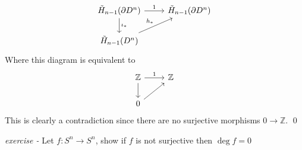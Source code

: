 \documentclass[11pt]{article}
\theoremstyle{definition}
\begin{document}
    \begin{equation*}
        \begin{tikzcd}
            \tilde{H}_{n-1}(\partial D^n) \arrow[r,"{1}"] \arrow[d,"{\iota_*}"] &\tilde{H}_{n-1}(\partial D^n) \\
            \tilde{H}_{n-1}(D^n) \arrow[ur,"{h_*}"]
        \end{tikzcd}
    \end{equation*}
    Where this diagram is equivalent to
    \begin{equation*}
        \begin{tikzcd}
            \mathbb{Z} \arrow[r,"{1}"] \arrow[d] &\mathbb{Z} \\
            0 \arrow[ur]
        \end{tikzcd}
    \end{equation*}
    This is clearly a contradiction since there are no surjective morphisms \(0 \to \mathbb{Z}\). \qed



    \emph{exercise - }\label{HEx11} Let \(f: S^n \to S^n\), show if \(f\) is not surjective then \(\deg f = 0\)
\end{document}

